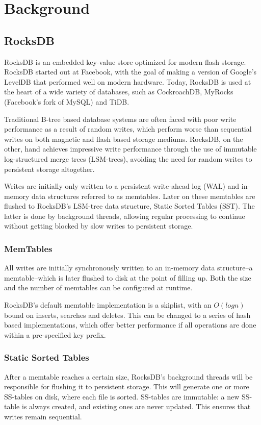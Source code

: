 \chapter{Background} \label{chap:background}

\section{RocksDB}
RocksDB is an embedded key-value store optimized for modern flash storage.
RocksDB started out at Facebook, with the goal of making a version of Google's
LevelDB that performed well on modern hardware. Today, RocksDB is used at the
heart of a wide variety of databases, such as CockroachDB, MyRocks (Facebook's
fork of MySQL) and TiDB.

Traditional B-tree based database systems are often faced with poor write
performance as a result of random writes, which perform worse than sequential
writes on both magnetic and flash based storage mediums. RocksDB, on the other,
hand achieves impressive write performance through the use of immutable
log-structured merge trees (LSM-trees), avoiding the need for random writes to
persistent storage altogether.

Writes are initially only written to a persistent write-ahead log (WAL) and
in-memory data structures referred to as memtables. Later on these memtables are
flushed to RocksDB's LSM-tree data structure, Static Sorted Tables (SST). The
latter is done by background threads, allowing regular processing to continue
without getting blocked by slow writes to persistent storage.


\subsection{MemTables}
All writes are initially synchronously written to an in-memory data structure--a
memtable--which is later flushed to disk at the point of filling up. Both the
size and the number of memtables can be configured at runtime.

RocksDB's default memtable implementation is a skiplist, with an $ O(log n) $
bound on inserts, searches and deletes. This can be changed to a series of hash
based implementations, which offer better performance if all operations are done
within a pre-specified key prefix.

\subsection{Static Sorted Tables}
After a memtable reaches a certain size, RocksDB's background threads will be
responsible for flushing it to persistent storage. This will generate one or
more SS-tables on disk, where each file is sorted. SS-tables are immutable: a
new SS-table is always created, and existing ones are never updated. This
ensures that writes remain sequential.

